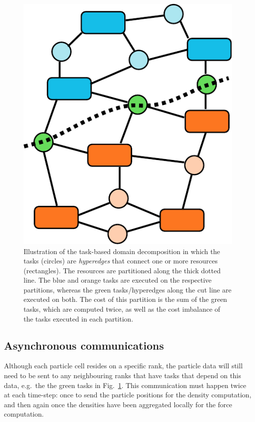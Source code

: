 \documentclass{sig-alternate-05-2015}
\begin{document}
\begin{figure}
\centering
\includegraphics[width=0.8\columnwidth]{Figures/task_graph_cut}
\caption{Illustration of the task-based domain decomposition
  in which the tasks (circles) are {\em hyperedges} that connect one or
  more resources (rectangles). The resources are partitioned
  along the thick dotted line. The blue and orange tasks are
  executed on the respective partitions, whereas the green
  tasks/hyperedges along the cut line are executed on both.
  The cost of this partition is the sum of the green tasks,
  which are computed twice, as well as the cost imbalance
  of the tasks executed in each partition.}
\label{taskgraphcut}
\end{figure}  


\subsection{Asynchronous communications}

Although each particle cell resides on a specific rank, the particle
data will still need to be sent to any neighbouring ranks that have
tasks that depend on this data, e.g.~the the green tasks in
Fig.~\ref{taskgraphcut}.
This communication must happen twice at each time-step: once to send
the particle positions for the density computation, and then again
once the densities have been aggregated locally for the force
computation.
\end{document}
